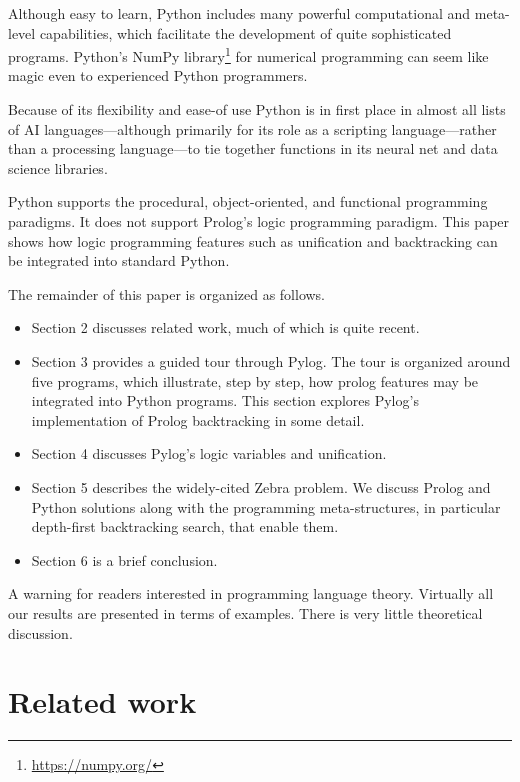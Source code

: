 Although easy to learn, Python includes many powerful computational and meta-level capabilities, which facilitate the development of quite sophisticated programs. Python's NumPy library\footnote{\url{https://numpy.org/}} for numerical programming can seem like magic even to experienced Python programmers. 

Because of its flexibility and ease-of use Python is in first place in almost all lists of AI languages---although primarily for its role as a scripting language---rather than a processing language---to tie together functions in its neural net and data science libraries. 

Python supports the procedural, object-oriented, and functional programming paradigms. It does not support Prolog's logic programming paradigm. This paper shows how logic programming features such as unification and backtracking can be integrated into standard Python.

The remainder of this paper is organized as follows.
 \begin{itemize}

 \item Section 2 discusses related work, much of which is quite recent.  

\item Section 3 provides a guided tour through Pylog. The tour is organized around five programs, which illustrate, step by step, how prolog features may be integrated into Python programs. This section explores Pylog's implementation of Prolog backtracking in some detail.

\item Section 4 discusses Pylog's logic variables and unification. 

\item Section 5 describes the widely-cited Zebra problem. We discuss Prolog and Python solutions along with the programming meta-structures, in particular depth-first backtracking search, that enable them. 

\item Section 6 is a brief conclusion.  
\end{itemize} 

A warning for readers interested in programming language theory. Virtually all our results are presented in terms of examples. There is very little theoretical discussion.

\section{Related work}

